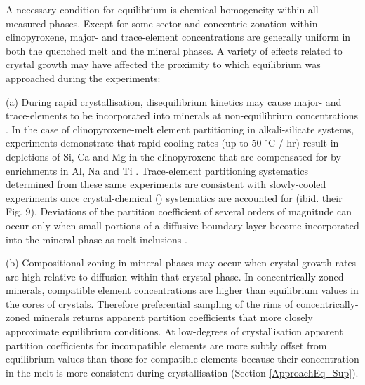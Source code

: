 \documentclass[review,authoryear,12pt]{elsarticle}
\newcommand{\dgC}{$^\circ$C }
\begin{document}
A necessary condition for equilibrium is chemical homogeneity within all measured phases. Except for some sector and concentric zonation within clinopyroxene, major- and trace-element concentrations are generally uniform in both the quenched melt and the mineral phases.
	A variety of effects related to crystal growth may have affected the proximity to which equilibrium was approached during the experiments:

(a) %
	During rapid crystallisation, disequilibrium kinetics may cause major- and trace-elements to be incorporated into minerals at non-equilibrium concentrations \citep{Lu1995}. In the case of clinopyroxene-melt element partitioning in alkali-silicate systems, experiments demonstrate that rapid cooling rates (up to 50 \dgC/ hr) result in depletions of Si, Ca and Mg in the clinopyroxene that are compensated for by enrichments in Al, Na and Ti \citep{Mollo2013}. Trace-element partitioning systematics determined from these same experiments are consistent with slowly-cooled experiments once crystal-chemical () systematics are accounted for (ibid. their Fig. 9).
	Deviations of the partition coefficient of several orders of magnitude can occur only when small portions of a diffusive boundary layer become incorporated into the mineral phase as melt inclusions \citep{Kennedy1993}. %

(b) 
	Compositional zoning in mineral phases may occur when crystal growth rates are high relative to diffusion within that crystal phase. In concentrically-zoned minerals, compatible element concentrations are higher than equilibrium values in the cores of crystals. Therefore preferential sampling of the rims of concentrically-zoned minerals returns apparent partition coefficients that more closely approximate equilibrium conditions.
 At low-degrees of crystallisation apparent partition coefficients for incompatible elements are more subtly offset from equilibrium values than those for compatible elements because their concentration in the melt is more consistent during crystallisation (Section \ref{ApproachEq_Sup}).
\end{document}
